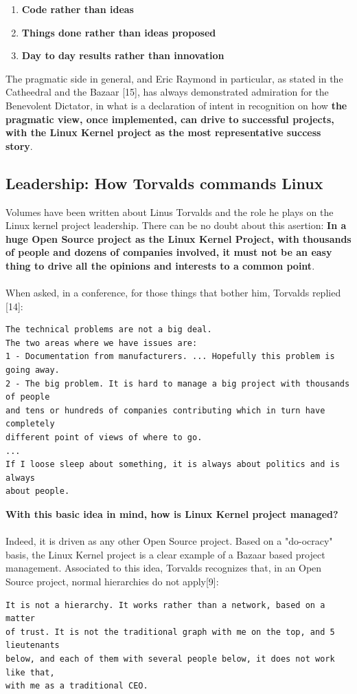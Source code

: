 \documentclass[11pt]{article}
\begin{document}
\begin{enumerate}\itemsep0pt
\item{\textbf{Code rather than ideas}}
\item{\textbf{Things done rather than ideas proposed}}
\item{\textbf{Day to day results rather than innovation}}
\end{enumerate}
The pragmatic side in general, and Eric Raymond in particular, as stated in the Catheedral and the Bazaar [15], has always demonstrated admiration for the Benevolent Dictator, in what is a declaration of intent in recognition on how \textbf{the pragmatic view, once implemented, can drive to successful projects, with the Linux Kernel project as the most representative success story}.
\subsection{Leadership: How Torvalds commands Linux}
Volumes have been written about Linus Torvalds and the role he plays on the Linux kernel project leadership. There can be no doubt about this asertion: \textbf{In a huge Open Source project as the Linux Kernel Project, with thousands of people and dozens of companies involved, it must not be an easy thing to drive all the opinions and interests to a common point}.\\
\\
When asked, in a conference, for those things that bother him, Torvalds replied [14]:
\begin{verbatim}
The technical problems are not a big deal.
The two areas where we have issues are:
1 - Documentation from manufacturers. ... Hopefully this problem is going away.
2 - The big problem. It is hard to manage a big project with thousands of people 
and tens or hundreds of companies contributing which in turn have completely 
different point of views of where to go.
...
If I loose sleep about something, it is always about politics and is always 
about people.
\end{verbatim}
\textbf{With this basic idea in mind, how is Linux Kernel project managed?}\\
\\
Indeed, it is driven as any other Open Source project. Based on a "do-ocracy" basis, the Linux Kernel project is a clear example of a Bazaar based project management. Associated to this idea, Torvalds recognizes that, in an Open Source project, normal hierarchies do not apply[9]:
\begin{verbatim}
It is not a hierarchy. It works rather than a network, based on a matter 
of trust. It is not the traditional graph with me on the top, and 5 lieutenants
below, and each of them with several people below, it does not work like that,
with me as a traditional CEO.
\end{verbatim}
\end{document}

